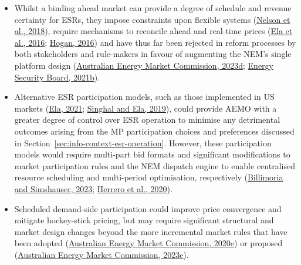 \documentclass[12pt,a4paper,]{report}
\providecommand{\tightlist}{%
  \setlength{\itemsep}{0pt}\setlength{\parskip}{0pt}}
\begin{document}
\begin{itemize}
\tightlist
\item
  Whilst a binding ahead market can provide a degree of schedule and
  revenue certainty for ESRs, they impose constraints upon flexible
  systems
  (\protect\hyperlink{ref-nelsonInvestigatingEconomicValue2018}{Nelson
  et al., 2018}), require mechanisms to reconcile ahead and real-time
  prices (\protect\hyperlink{ref-elaWholesaleElectricityMarket2016}{Ela
  et al., 2016};
  \protect\hyperlink{ref-hoganVirtualBiddingElectricity2016a}{Hogan,
  2016}) and have thus far been rejected in reform processes by both
  stakeholders and rule-makers in favour of augmenting the NEM's single
  platform design
  (\protect\hyperlink{ref-australianenergymarketcommissionImprovingSecurityFrameworks2023}{Australian
  Energy Market Commission, 2023d};
  \protect\hyperlink{ref-energysecurityboardPost2025MarketDesign2021}{Energy
  Security Board, 2021b}).
\item
  Alternative ESR participation models, such as those implemented in US
  markets
  (\protect\hyperlink{ref-elaIntegrationElectricStorage2021}{Ela, 2021};
  \protect\hyperlink{ref-singhalIncorporatingElectricStorage2019}{Singhal
  and Ela, 2019}), could provide AEMO with a greater degree of control
  over ESR operation to minimise any detrimental outcomes arising from
  the MP participation choices and preferences discussed in
  Section~\ref{sec:info-context-esr-operation}. However, these
  participation models would require multi-part bid formats and
  significant modifications to market participation rules and the NEM
  dispatch engine to enable centralised resource scheduling and
  multi-period optimisation, respectively
  (\protect\hyperlink{ref-billimoriaContractDesignStorage2023a}{Billimoria
  and Simshauser, 2023};
  \protect\hyperlink{ref-herreroEvolvingBiddingFormats2020}{Herrero et
  al., 2020}).
\item
  Scheduled demand-side participation could improve price convergence
  and mitigate hockey-stick pricing, but may require significant
  structural and market design changes beyond the more incremental
  market rules that have been adopted
  (\protect\hyperlink{ref-australianenergymarketcommissionWholesaleDemandResponse2020}{Australian
  Energy Market Commission, 2020e}) or proposed
  (\protect\hyperlink{ref-australianenergymarketcommissionIntegratingPriceresponsiveResources2023}{Australian
  Energy Market Commission, 2023e}).
\end{itemize}
\end{document}
